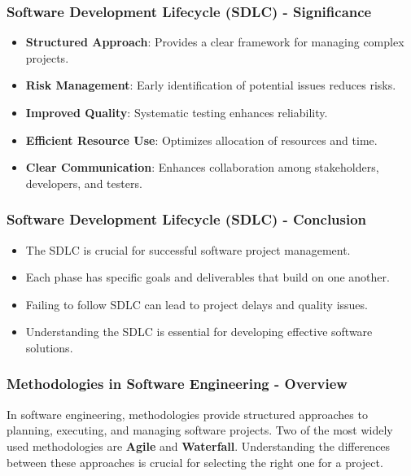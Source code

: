 \documentclass{beamer}
\begin{document}
\begin{frame}[fragile]
    \frametitle{Software Development Lifecycle (SDLC) - Significance}
    \begin{itemize}
        \item \textbf{Structured Approach}: Provides a clear framework for managing complex projects.
        \item \textbf{Risk Management}: Early identification of potential issues reduces risks.
        \item \textbf{Improved Quality}: Systematic testing enhances reliability.
        \item \textbf{Efficient Resource Use}: Optimizes allocation of resources and time.
        \item \textbf{Clear Communication}: Enhances collaboration among stakeholders, developers, and testers.
    \end{itemize}
\end{frame}

\begin{frame}[fragile]
    \frametitle{Software Development Lifecycle (SDLC) - Conclusion}
    \begin{itemize}
        \item The SDLC is crucial for successful software project management.
        \item Each phase has specific goals and deliverables that build on one another.
        \item Failing to follow SDLC can lead to project delays and quality issues.
        \item Understanding the SDLC is essential for developing effective software solutions.
    \end{itemize}
\end{frame}

\begin{frame}[fragile]
    \frametitle{Methodologies in Software Engineering - Overview}
    In software engineering, methodologies provide structured approaches to planning, executing, and managing software projects. Two of the most widely used methodologies are \textbf{Agile} and \textbf{Waterfall}. Understanding the differences between these approaches is crucial for selecting the right one for a project.
\end{frame}
\end{document}
